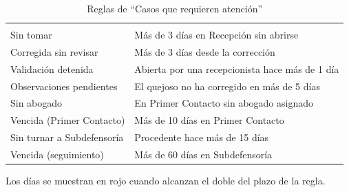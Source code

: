 	\small
	\renewcommand{\arraystretch}{1.2}
	\setlength{\tabcolsep}{4pt}
	\begin{longtable}{|p{5.0cm}|p{9.5cm}|}
		\caption{Reglas de ``Casos que requieren atención''}
		\label{tab:reglas_atencion} \\
		\hline
		\rowcolor{headerblue}
		\headercell{Regla} & \headercell{Condición} \\
		\hline
		\endfirsthead
		\hline
		\rowcolor{headerblue}
		\headercell{Regla} & \headercell{Condición} \\
		\hline
		\endhead
		Sin tomar & Más de 3 días en Recepción sin abrirse \\ \hline
		Corregida sin revisar & Más de 3 días desde la corrección \\ \hline
		Validación detenida & Abierta por una recepcionista hace más de 1 día \\ \hline
		Observaciones pendientes & El quejoso no ha corregido en más de 5 días \\ \hline
		Sin abogado & En Primer Contacto sin abogado asignado \\ \hline
		Vencida (Primer Contacto) & Más de 10 días en Primer Contacto \\ \hline
		Sin turnar a Subdefensoría & Procedente hace más de 15 días \\ \hline
		Vencida (seguimiento) & Más de 60 días en Subdefensoría \\ \hline
	\end{longtable}
	\normalsize

	Los días se muestran en rojo cuando alcanzan el doble del plazo de la regla.

